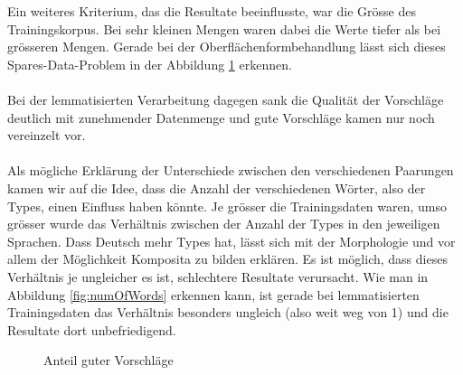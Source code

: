 \documentclass[11pt,twoside,openright]{mpreport}
\begin{document}
Ein weiteres Kriterium, das die Resultate beeinflusste, war die Grösse des Trainingskorpus. Bei sehr kleinen Mengen waren dabei die Werte tiefer als bei grösseren Mengen. Gerade bei der Oberflächenformbehandlung lässt sich dieses Spares-Data-Problem in der Abbildung \ref{fig:accuracy} erkennen.
\\
\\
Bei der lemmatisierten Verarbeitung dagegen sank die Qualität der Vorschläge deutlich mit zunehmender Datenmenge und gute Vorschläge kamen nur noch vereinzelt vor.
\\
\\
Als mögliche Erklärung der Unterschiede zwischen den verschiedenen Paarungen kamen wir auf die Idee, dass die Anzahl der verschiedenen Wörter, also der Types, einen Einfluss haben könnte. Je grösser die Trainingsdaten waren, umso grösser wurde das Verhältnis zwischen der Anzahl der Types in den jeweiligen Sprachen. Dass Deutsch mehr Types hat, lässt sich mit der Morphologie und vor allem der Möglichkeit Komposita zu bilden erklären. Es ist möglich, dass dieses Verhältnis je ungleicher es ist, schlechtere Resultate verursacht. Wie man in Abbildung \ref{fig:numOfWords} erkennen kann, ist gerade bei lemmatisierten Trainingsdaten das 
Verhältnis besonders ungleich (also weit weg von 1) und die Resultate dort 
unbefriedigend.
\begin{figure}[H]
\hspace{-6cm}
\caption{Anteil guter Vorschläge}
\label{fig:accuracy}
\end{figure}
\end{document}
